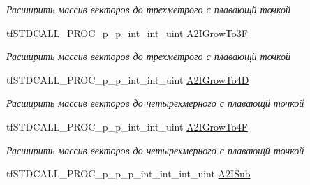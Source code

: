 \begin{DoxyCompactItemize}
\begin{DoxyCompactList}\small\item\em Расширить массив векторов до трехметрого с плавающй точкой \end{DoxyCompactList}\item 
\hypertarget{structs_functions_array_vector_c_p_u_ab61d5f62454a1965f1bea1f8d37721a9}{tf\-S\-T\-D\-C\-A\-L\-L\-\_\-\-P\-R\-O\-C\-\_\-p\-\_\-p\-\_\-int\-\_\-int\-\_\-uint \hyperlink{structs_functions_array_vector_c_p_u_ab61d5f62454a1965f1bea1f8d37721a9}{A2\-I\-Grow\-To3\-F}}\label{structs_functions_array_vector_c_p_u_ab61d5f62454a1965f1bea1f8d37721a9}

\begin{DoxyCompactList}\small\item\em Расширить массив векторов до трехметрого с плавающй точкой \end{DoxyCompactList}\item 
\hypertarget{structs_functions_array_vector_c_p_u_aa2aeced00c2eb626bb6ab6dbec57746a}{tf\-S\-T\-D\-C\-A\-L\-L\-\_\-\-P\-R\-O\-C\-\_\-p\-\_\-p\-\_\-int\-\_\-int\-\_\-uint \hyperlink{structs_functions_array_vector_c_p_u_aa2aeced00c2eb626bb6ab6dbec57746a}{A2\-I\-Grow\-To4\-D}}\label{structs_functions_array_vector_c_p_u_aa2aeced00c2eb626bb6ab6dbec57746a}

\begin{DoxyCompactList}\small\item\em Расширить массив векторов до четырехмерного с плавающй точкой \end{DoxyCompactList}\item 
\hypertarget{structs_functions_array_vector_c_p_u_a96a74d8e31746c7e130ec8d96a06d1cf}{tf\-S\-T\-D\-C\-A\-L\-L\-\_\-\-P\-R\-O\-C\-\_\-p\-\_\-p\-\_\-int\-\_\-int\-\_\-uint \hyperlink{structs_functions_array_vector_c_p_u_a96a74d8e31746c7e130ec8d96a06d1cf}{A2\-I\-Grow\-To4\-F}}\label{structs_functions_array_vector_c_p_u_a96a74d8e31746c7e130ec8d96a06d1cf}

\begin{DoxyCompactList}\small\item\em Расширить массив векторов до четырехмерного с плавающй точкой \end{DoxyCompactList}\item 
\hypertarget{structs_functions_array_vector_c_p_u_a38e4c6eddfa0272a5e10ed4ce6c8bad5}{tf\-S\-T\-D\-C\-A\-L\-L\-\_\-\-P\-R\-O\-C\-\_\-p\-\_\-p\-\_\-p\-\_\-int\-\_\-int\-\_\-int\-\_\-uint \hyperlink{structs_functions_array_vector_c_p_u_a38e4c6eddfa0272a5e10ed4ce6c8bad5}{A2\-I\-Sub}}\label{structs_functions_array_vector_c_p_u_a38e4c6eddfa0272a5e10ed4ce6c8bad5}


\end{DoxyCompactItemize}
